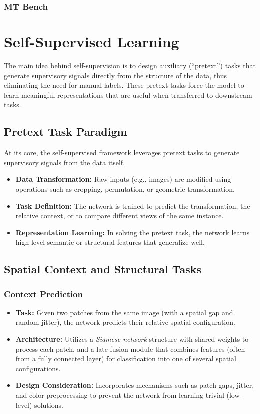 \documentclass{article}
\begin{document}
\subsubsection{MT Bench}

\clearpage\newpage

\section{Self-Supervised Learning}

The main idea behind self-supervision is to design auxiliary (“pretext”) tasks that generate supervisory signals directly from the structure of the data, thus eliminating the need for manual labels. These pretext tasks force the model to learn meaningful representations that are useful when transferred to downstream tasks.

\subsection{Pretext Task Paradigm}

At its core, the self-supervised framework leverages pretext tasks to generate supervisory signals from the data itself.

\begin{itemize}
    \item \textbf{Data Transformation:} Raw inputs (e.g., images) are modified using operations such as cropping, permutation, or geometric transformation.
    \item \textbf{Task Definition:} The network is trained to predict the transformation, the relative context, or to compare different views of the same instance.
    \item \textbf{Representation Learning:} In solving the pretext task, the network learns high-level semantic or structural features that generalize well.
\end{itemize}

\subsection{Spatial Context and Structural Tasks}
\subsubsection{Context Prediction}
\begin{itemize}
    \item \textbf{Task:} Given two patches from the same image (with a spatial gap and random jitter), the network predicts their relative spatial configuration.
    \item \textbf{Architecture:} Utilizes a \emph{Siamese network} structure with shared weights to process each patch, and a late-fusion module that combines features (often from a fully connected layer) for classification into one of several spatial configurations.
    \item \textbf{Design Consideration:} Incorporates mechanisms such as patch gaps, jitter, and color preprocessing to prevent the network from learning trivial (low-level) solutions.
\end{itemize}
\end{document}
